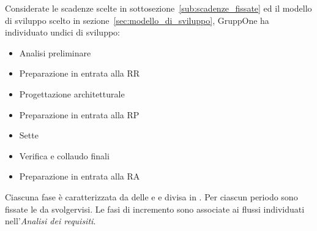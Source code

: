 \documentclass[../piano-di-progetto.tex]{subfiles}
\begin{document}
Considerate le scadenze scelte in sottosezione~\ref{sub:scadenze_fissate} ed il modello di sviluppo scelto in sezione~\ref{sec:modello_di_sviluppo}, GruppOne ha individuato undici  di sviluppo:
\begin{itemize}
  \item Analisi preliminare
  \item Preparazione in entrata alla RR
  \item Progettazione architetturale
  \item Preparazione in entrata alla RP
  \item Sette 
  \item Verifica e collaudo finali
  \item Preparazione in entrata alla RA
\end{itemize}
Ciascuna fase è caratterizzata da delle  e  e divisa in .
Per ciascun periodo sono fissate le  da svolgervisi. Le fasi di incremento sono associate ai flussi individuati nell'\textit{Analisi dei requisiti}.
\end{document}
